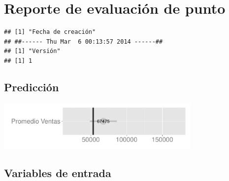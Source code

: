\documentclass{article}\usepackage[]{graphicx}\usepackage[]{color}
\makeatletter
\newenvironment{kframe}{%
 \def\at@end@of@kframe{}%
 \ifinner\ifhmode%
  \def\at@end@of@kframe{\end{minipage}}%
  \begin{minipage}{\columnwidth}%
 \fi\fi%
 \def\FrameCommand##1{\hskip\@totalleftmargin \hskip-\fboxsep
 \colorbox{shadecolor}{##1}\hskip-\fboxsep
     \hskip-\linewidth \hskip-\@totalleftmargin \hskip\columnwidth}%
 \MakeFramed {\advance\hsize-\width
   \@totalleftmargin\z@ \linewidth\hsize
   \@setminipage}}%
 {\par\unskip\endMakeFramed%
 \at@end@of@kframe}
\newenvironment{knitrout}{}{} %
\makeatother
\begin{document}
\section*{Reporte de evaluación de punto}



\begin{knitrout}
\color{fgcolor}\begin{kframe}
\begin{verbatim}
## [1] "Fecha de creación"
## ##------ Thu Mar  6 00:13:57 2014 ------##
## [1] "Versión"
## [1] 1
\end{verbatim}
\end{kframe}
\end{knitrout}

 

\subsection*{Predicción}
\begin{knitrout}
\color{fgcolor}
\includegraphics[width=10cm]{figure/unnamed-chunk-2} 

\end{knitrout}


\subsection*{Variables de entrada}
\end{document}
